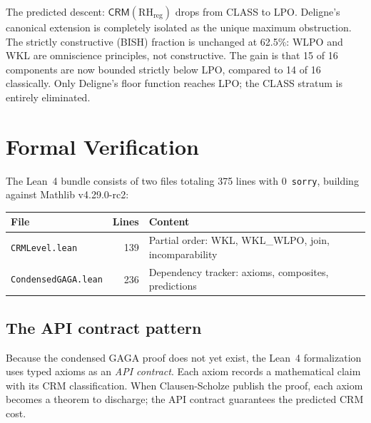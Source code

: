 \documentclass[11pt,a4paper]{article}
\theoremstyle{plain}
\theoremstyle{definition}
\newcommand{\BISH}{\textsf{BISH}}
\newcommand{\WKL}{\textsf{WKL}}
\newcommand{\WLPO}{\textsf{WLPO}}
\newcommand{\LPO}{\textsf{LPO}}
\newcommand{\CLASS}{\textsf{CLASS}}
\newcommand{\CRM}{\textsf{CRM}}
\begin{document}
The predicted descent: $\CRM(\text{RH}_{\text{reg}})$ drops from \CLASS{} to \LPO.
Deligne's canonical extension is completely isolated as the unique maximum obstruction.
The strictly constructive (\BISH) fraction is unchanged at 62.5\%: \WLPO{} and \WKL{} are omniscience principles, not constructive.
The gain is that 15 of 16 components are now bounded strictly below \LPO, compared to 14 of 16 classically.
Only Deligne's floor function reaches \LPO; the \CLASS{} stratum is entirely eliminated.

\section{Formal Verification}
\label{sec:lean}

The Lean~4 bundle consists of two files totaling 375 lines with 0~\texttt{sorry}, building against Mathlib v4.29.0-rc2:

\begin{center}
\small
\begin{tabular}{@{}lrl@{}}
\toprule
File & Lines & Content \\
\midrule
\texttt{CRMLevel.lean} & 139 & Partial order: \WKL, WKL\_WLPO, join, incomparability \\
\texttt{CondensedGAGA.lean} & 236 & Dependency tracker: axioms, composites, predictions \\
\bottomrule
\end{tabular}
\end{center}

\subsection{The API contract pattern}

Because the condensed GAGA proof does not yet exist, the Lean~4 formalization uses typed axioms as an \emph{API contract}.
Each axiom records a mathematical claim with its CRM classification.
When Clausen-Scholze publish the proof, each axiom becomes a theorem to discharge; the API contract guarantees the predicted CRM cost.
\end{document}
